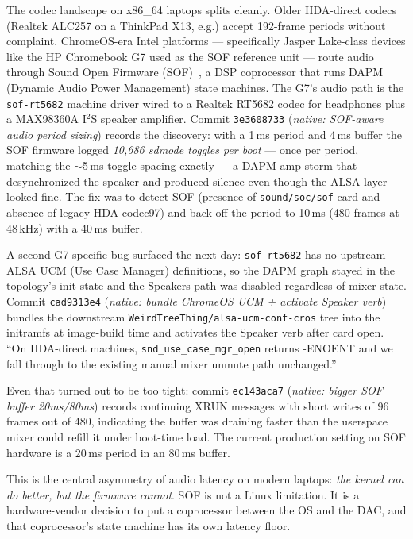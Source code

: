 \documentclass[10pt,letterpaper,twocolumn]{article}
\begin{document}
The codec landscape on x86\_64 laptops splits cleanly. Older HDA-direct codecs (Realtek ALC257 on a ThinkPad X13, e.g.) accept 192-frame periods without complaint. ChromeOS-era Intel platforms --- specifically Jasper Lake-class devices like the HP Chromebook G7 used as the SOF reference unit --- route audio through Sound Open Firmware (SOF)~\citep{sof}, a DSP coprocessor that runs DAPM (Dynamic Audio Power Management) state machines. The G7's audio path is the \texttt{sof-rt5682} machine driver wired to a Realtek RT5682 codec for headphones plus a MAX98360A I$^{2}$S speaker amplifier. Commit \texttt{3e3608733} (\emph{native: SOF-aware audio period sizing}) records the discovery: with a 1\,ms period and 4\,ms buffer the SOF firmware logged \emph{10{,}686 sdmode toggles per boot} --- once per period, matching the $\sim$5\,ms toggle spacing exactly --- a DAPM amp-storm that desynchronized the speaker and produced silence even though the ALSA layer looked fine. The fix was to detect SOF (presence of \texttt{sound/soc/sof} card and absence of legacy HDA codec97) and back off the period to 10\,ms (480 frames at 48\,kHz) with a 40\,ms buffer.

A second G7-specific bug surfaced the next day: \texttt{sof-rt5682} has no upstream ALSA UCM (Use Case Manager) definitions, so the DAPM graph stayed in the topology's init state and the Speakers path was disabled regardless of mixer state. Commit \texttt{cad9313e4} (\emph{native: bundle ChromeOS UCM + activate Speaker verb}) bundles the downstream \texttt{WeirdTreeThing/alsa-ucm-conf-cros} tree into the initramfs at image-build time and activates the Speaker verb after card open. ``On HDA-direct machines, \texttt{snd\_use\_case\_mgr\_open} returns -ENOENT and we fall through to the existing manual mixer unmute path unchanged.''

Even that turned out to be too tight: commit \texttt{ec143aca7} (\emph{native: bigger SOF buffer 20ms/80ms}) records continuing XRUN messages with short writes of 96 frames out of 480, indicating the buffer was draining faster than the userspace mixer could refill it under boot-time load. The current production setting on SOF hardware is a 20\,ms period in an 80\,ms buffer.

This is the central asymmetry of audio latency on modern laptops: \emph{the kernel can do better, but the firmware cannot}. SOF is not a Linux limitation. It is a hardware-vendor decision to put a coprocessor between the OS and the DAC, and that coprocessor's state machine has its own latency floor.
\end{document}

